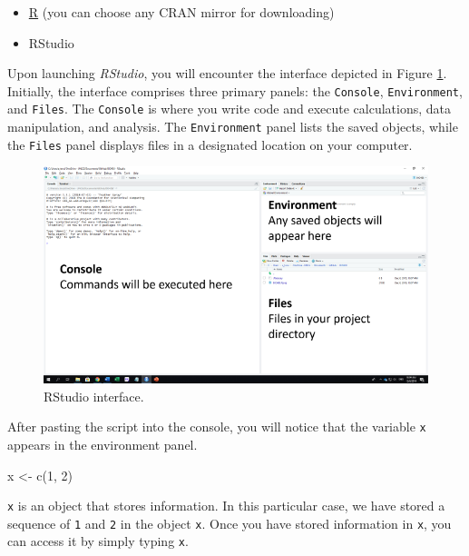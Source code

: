 \documentclass[
]{book}
\newenvironment{Shaded}{\begin{snugshade}}{\end{snugshade}}
\newcommand{\DecValTok}[1]{\textcolor[rgb]{0.00,0.00,0.81}{#1}}
\newcommand{\FunctionTok}[1]{\textcolor[rgb]{0.00,0.00,0.00}{#1}}
\newcommand{\NormalTok}[1]{#1}
\newcommand{\OtherTok}[1]{\textcolor[rgb]{0.56,0.35,0.01}{#1}}
\providecommand{\tightlist}{%
  \setlength{\itemsep}{0pt}\setlength{\parskip}{0pt}}
\begin{document}
\begin{itemize}
\tightlist
\item
  \href{https://www.r-project.org/}{R} (you can choose any CRAN mirror for downloading)
\item
  RStudio
\end{itemize}

Upon launching \emph{RStudio}, you will encounter the interface depicted in Figure \ref{fig:ui}. Initially, the interface comprises three primary panels: the \texttt{Console}, \texttt{Environment}, and \texttt{Files}. The \texttt{Console} is where you write code and execute calculations, data manipulation, and analysis. The \texttt{Environment} panel lists the saved objects, while the \texttt{Files} panel displays files in a designated location on your computer.

\begin{figure}

{\centering \includegraphics[width=9.47in]{image/r_image01} 

}

\caption{RStudio interface.}\label{fig:ui}
\end{figure}

After pasting the script into the console, you will notice that the variable \texttt{x} appears in the environment panel.

\begin{Shaded}
\begin{Highlighting}[]
\NormalTok{x }\OtherTok{\textless{}{-}} \FunctionTok{c}\NormalTok{(}\DecValTok{1}\NormalTok{, }\DecValTok{2}\NormalTok{)}
\end{Highlighting}
\end{Shaded}

\texttt{x} is an object that stores information. In this particular case, we have stored a sequence of \texttt{1} and \texttt{2} in the object \texttt{x}. Once you have stored information in \texttt{x}, you can access it by simply typing \texttt{x}.
\end{document}
